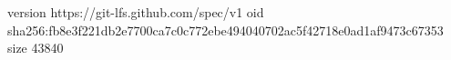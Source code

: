 version https://git-lfs.github.com/spec/v1
oid sha256:fb8e3f221db2e7700ca7c0c772ebe494040702ac5f42718e0ad1af9473c67353
size 43840
